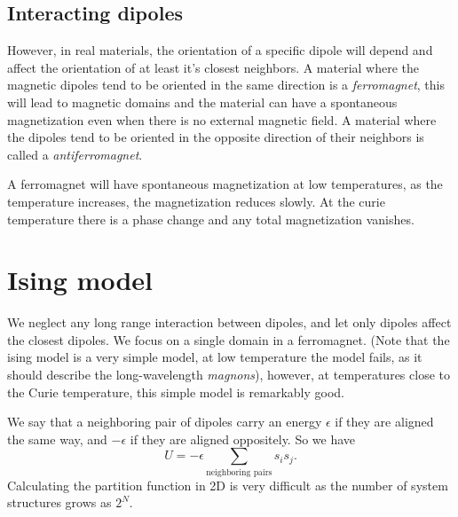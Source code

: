 \documentclass[a4paper, 11pt, notitlepage, english]{article}
\newcommand{\eps}{\epsilon}
\begin{document}
\subsection*{Interacting dipoles}

However, in real materials, the orientation of a specific dipole will depend and affect the orientation of at least it's closest neighbors. A material where the magnetic dipoles tend to be oriented in the same direction is a \emph{ferromagnet}, this will lead to magnetic domains and the material can have a spontaneous magnetization even when there is no external magnetic field. A material where the dipoles tend to be oriented in the opposite direction of their neighbors is called a \emph{antiferromagnet}.

A ferromagnet will have spontaneous magnetization at low temperatures, as the temperature increases, the magnetization reduces slowly. At the curie temperature there is a phase change and any total magnetization vanishes.


\section*{Ising model}

We neglect any long range interaction between dipoles, and let only dipoles affect the closest dipoles. We focus on a single domain in a ferromagnet. (Note that the ising model is a very simple model, at low temperature the model fails, as it should describe the long-wavelength \emph{magnons}), however, at temperatures close to the Curie temperature, this simple model is remarkably good.

We say that a neighboring pair of dipoles carry an energy $\eps$ if they are aligned the same way, and $-\eps$ if they are aligned oppositely. So we have
$$U = - \eps \sum_{\mbox{neighboring pairs}} s_is_j.$$
Calculating the partition function in 2D is very difficult as the number of system structures grows as $2^N$. 
\end{document}
